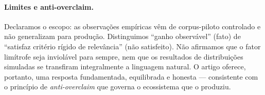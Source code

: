 \paragraph{Limites e anti-overclaim.}
Declaramos o escopo: as observações empíricas vêm de corpus-piloto controlado e
não generalizam para produção. Distinguimos ``ganho observável'' (fato) de
``satisfaz critério rígido de relevância'' (não satisfeito). Não afirmamos que o
fator limítrofe seja inviolável para sempre, nem que os resultados de
distribuições simuladas se transfiram integralmente a linguagem natural. O
artigo oferece, portanto, uma resposta fundamentada, equilibrada e honesta ---
consistente com o princípio de \emph{anti-overclaim} que governa o ecossistema
que o produziu.
